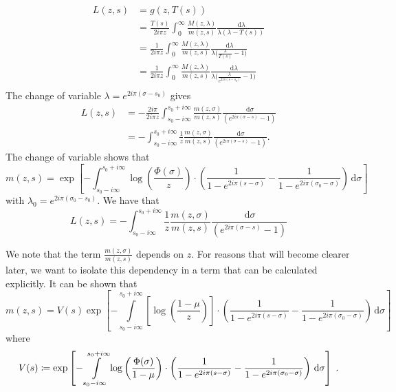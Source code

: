 \documentclass[11pt]{amsart}
\newcommand{\diff}{\,\mathrm{d}}
\begin{document}
\begin{align*}
    L(z,s) &= g(z,T(s)) \\ 
    &= 
    \frac{T(s)}{2i \pi z}\int_0^\infty  \frac{M(z,\lambda)}{m(z,s)} \frac{\diff \lambda}{\lambda(\lambda-T(s))} \\
    &= 
    \frac{1}{2i\pi z}\int_0^\infty  \frac{M(z,\lambda)}{m(z,s)} \frac{\diff \lambda}{\lambda\Big(\frac{\lambda}{T(s)}-1\Big)} \\
    &= 
    \frac{1}{2i\pi z}\int_0^\infty  \frac{M(z,\lambda)}{m(z,s)} \frac{\diff \lambda}{\lambda\Big(\frac{\lambda}{e^{2i\pi(s-s_0)}}-1\Big)} \\
\end{align*}
The change of variable $\lambda = e^{2i\pi(\sigma-s_0)}$ gives
\begin{align*}
    L(z,s)
    &= 
    - \frac{2i\pi }{2i\pi z}\int_{s_0-i\infty}^{s_0+i\infty}  \frac{m(z,\sigma)}{m(z,s)} \frac{\diff \sigma}{(e^{2i\pi(\sigma-s)}-1)} \\
    &= 
   - \int_{s_0-i\infty}^{s_0+i\infty} \frac{1}{z}  \frac{m(z,\sigma)}{m(z,s)} \frac{\diff \sigma}{(e^{2i\pi(\sigma-s)}-1)}. 
\end{align*}
The change of variable shows that
\begin{equation}
    m(z,s) = \exp \left[
    - \int_{s_0-i\infty}^{s_0+i\infty}\log \left( \frac{\Phi(
    \sigma)}{z}\right)
    \cdot \left(
        \frac{1}{1-e^{2i\pi(s-\sigma)}} - \frac{1}{1-e^{2i\pi(\sigma_0-\sigma)}}
     \right) \diff \sigma
    \right]
\end{equation} 
with $\lambda_0 = e^{2i\pi(\sigma_0 - s_0)}$. 
We have that 
\begin{equation}
    L(z,s) 
    = 
   - \int_{s_0-i\infty}^{s_0+i\infty} \frac{1}{z}  \frac{m(z,\sigma)}{m(z,s)} \frac{\diff \sigma}{(e^{2i\pi(\sigma-s)}-1)}
\end{equation}

We note that the term $\frac{m(z,\sigma)}{m(z,s)}$ depends on $z$. For reasons that will become clearer later, we want to isolate this dependency in a term that can be calculated explicitly. 
It can be shown that 
\begin{equation}
    m(z,s) = V(s)
    \exp \left[
    - \int\limits_{s_0-i\infty}^{s_0+i\infty} \left[\log \left( \frac{1-\mu}{z}\right)\right]
    \cdot \left(
        \frac{1}{1-e^{2i\pi(s-\sigma)}} - \frac{1}{1-e^{2i\pi(\sigma_0-\sigma)}}
     \right) \diff \sigma
    \right]
    \label{eq:uselogbranch}
\end{equation}
where 
\begin{equation}
V(s) \coloneqq \exp \left[
    - \int\limits_{s_0-i\infty}^{s_0+i\infty}\log \left( \frac{\Phi(\sigma)}{1-\mu}\right)
    \cdot \left(
        \frac{1}{1-e^{2i\pi(s-\sigma)}} - \frac{1}{1-e^{2i\pi(\sigma_0-\sigma)}}
     \right) \diff \sigma 
    \right]
    \eqfinp
\end{equation}
\end{document}
